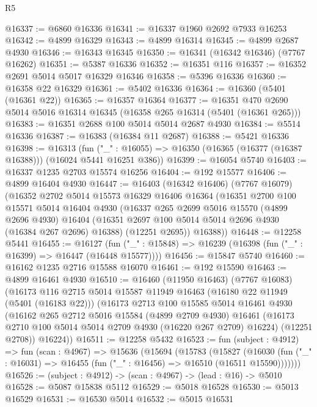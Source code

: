 \begin{lexlean}{R5}
\begin{coremodule}
@16337 := @6860 @16336
@16341 := @16337 @1960 @2692 @7933 @16253
@16342 := @4899 @16329
@16343 := @4899 @16314
@16345 := @4899 @2687 @4930
@16346 := @16343 @16345
@16350 := @16341 (@16342 @16346) (@7767 @16262)
@16351 := @5387 @16336
@16352 := @16351 @116
@16357 := @16352 @2691 @5014 @5017 @16329 @16346
@16358 := @5396 @16336
@16360 := @16358 @22 @16329
@16361 := @5402 @16336
@16364 := @16360 (@5401 (@16361 @22))
@16365 := @16357 @16364
@16377 := @16351 @470 @2690 @5014 @5016 @16314 @16345 (@16358 @265 @16314 (@5401 (@16361 @265)))
@16383 := @16351 @2688 @100 @5014 @5014 @2687 @4930
@16384 := @5514 @16336
@16387 := @16383 (@16384 @11 @2687)
@16388 := @5421 @16336
@16398 := @16313
    (fun ("_" : @16055) => @16350 (@16365 (@16377 (@16387 @16388))) (@16024 @5441 @16251 @386))
@16399 := @16054 @5740
@16403 := @16337 @1235 @2703 @15574 @16256
@16404 := @192 @15577
@16406 := @4899 @16404 @4930
@16447 := @16403
    (@16342 @16406)
    (@7767 @16079)
    (@16352
      @2702
      @5014
      @15573
      @16329
      @16406
      @16364
      (@16351
        @2700
        @100
        @15571
        @5014
        @16404
        @4930
        (@16337
          @265
          @2699
          @5016
          @15570
          (@4899 @2696 @4930)
          @16404
          (@16351 @2697 @100 @5014 @5014 @2696 @4930 (@16384 @267 @2696) @16388)
          (@12251 @2695))
        @16388))
@16448 := @12258 @5441
@16455 := @16127
    (fun ("_" : @15848) => @16239 (@16398 (fun ("_" : @16399) => @16447 (@16448 @15577))))
@16456 := @15847 @5740
@16460 := @16162 @1235 @2716 @15588 @16070
@16461 := @192 @15590
@16463 := @4899 @16461 @4930
@16510 := @16460
    (@11950 @16463)
    (@7767 @16083)
    (@16173
      @116
      @2715
      @5014
      @15587
      @11949
      @16463
      (@16180 @22 @11949 (@5401 (@16183 @22)))
      (@16173
        @2713
        @100
        @15585
        @5014
        @16461
        @4930
        (@16162
          @265
          @2712
          @5016
          @15584
          (@4899 @2709 @4930)
          @16461
          (@16173 @2710 @100 @5014 @5014 @2709 @4930 (@16220 @267 @2709) @16224)
          (@12251 @2708))
        @16224))
@16511 := @12258 @5432
@16523 := fun (subject : @4912) =>
  fun (scan : @4967) =>
  @15636
    (@15694
      (@15783
        (@15827
          (@16030 (fun ("_" : @16031) => @16455 (fun ("_" : @16456) => @16510 (@16511 @15590)))))))
@16526 := (subject : @4912) -> (scan : @4967) -> (lead : @16) -> @5010
@16528 := @5087 @15838 @5112
@16529 := @5018 @16528
@16530 := @5013 @16529
@16531 := @16530 @5014
@16532 := @5015 @16531

\end{coremodule}
\end{lexlean}
